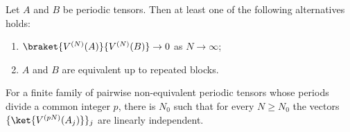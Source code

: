 \begin{theorem}\label{thm:periodic_overlap_dichotomy}
    \notready
    Let $A$ and $B$ be periodic tensors. Then at least one of the following
    alternatives holds:
    \begin{enumerate}
        \item $\braket{V^{(N)}(A)}{V^{(N)}(B)} \to 0$ as $N\to\infty$;
        \item $A$ and $B$ are equivalent up to repeated blocks.
    \end{enumerate}
\end{theorem}

\begin{theorem}%
    \label{thm:periodic_basis_eventually_li}
    \notready
    For a finite family of pairwise non-equivalent periodic tensors whose
    periods divide a common integer $p$, there is $N_0$ such that for every
    $N \ge N_0$ the vectors $\{\ket{V^{(pN)}(A_j)}\}_j$ are linearly independent.
\end{theorem}


